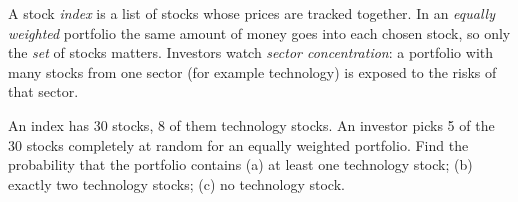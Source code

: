 
\begin{problem}
	\begin{context}
		A stock \emph{index} is a list of stocks whose prices are tracked
		together. In an \emph{equally weighted} portfolio the same amount of
		money goes into each chosen stock, so only the \emph{set} of stocks
		matters. Investors watch \emph{sector concentration}: a portfolio with
		many stocks from one sector (for example technology) is exposed to the
		risks of that sector.
	\end{context}
	An index has 30 stocks, 8 of them technology stocks. An investor picks 5
	of the 30 stocks completely at random for an equally weighted portfolio.
	Find the probability that the portfolio contains (a) at least one
	technology stock; (b) exactly two technology stocks; (c) no technology
	stock.
\end{problem}

